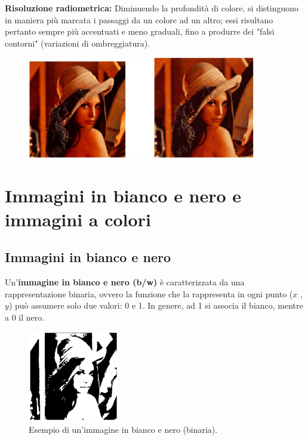 \begin{trivlist}
    \item \textbf{Risoluzione radiometrica:} Diminuendo la profondità di colore,
    si distinguono in maniera più marcata i passaggi da un colore ad un altro;
    essi risultano pertanto sempre più accentuati e meno graduali, fino a
    produrre dei "falsi contorni" (variazioni di ombreggiatura).
    \begin{figure}[H]
        \centering
        \includegraphics[width=10cm, keepaspectratio]{capitoli/immagini/imgs/esempio_risoluzione_radiometrica.jpg}
    \end{figure}
\end{trivlist}

\section{Immagini in bianco e nero e immagini a colori}

\subsection{Immagini in bianco e nero}

Un'\textbf{immagine in bianco e nero (b/w)} è caratterizzata da una
rappresentazione binaria, ovvero la funzione che la rappresenta in ogni punto
($x$ , $y$) può assumere solo due valori: 0 e 1. In genere, ad 1 si associa il
bianco, mentre a 0 il nero.

\begin{figure}[H]
    \centering
    \includegraphics[width=4cm, keepaspectratio]{capitoli/immagini/imgs/immagine_binaria_bianco_nero.jpg}
    \caption{Esempio di un'immagine in bianco e nero (binaria).}
\end{figure}

